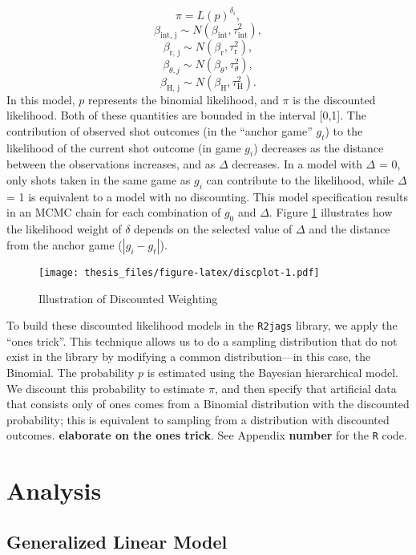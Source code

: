 \documentclass[12pt,twoside]{dukestatscithesis}
\theoremstyle{definition}
\theoremstyle{definition}
\theoremstyle{definition}
\theoremstyle{remark}
\begin{document}
\[
\pi = L(p)^{\delta_i},
\] \[
\beta_{\text{int, j}} \sim N(\beta_{\text{int}}, \tau^2_{\text{int}}),
\] \[
\beta_{\text{r, j}} \sim N(\beta_{\text{r}}, \tau^2_{\text{r}}),
\] \[
\beta_{\theta, j} \sim N(\beta_{\theta}, \tau^2_{\theta}),
\] \[
\beta_{\text{H, j}} \sim N(\beta_{\text{H}}, \tau^2_{\text{H}}).
\] In this model, \(p\) represents the binomial likelihood, and \(\pi\)
is the discounted likelihood. Both of these quantities are bounded in
the interval {[}0,1{]}. The contribution of observed shot outcomes (in
the ``anchor game'' \(g_t\)) to the likelihood of the current shot
outcome (in game \(g_i\)) decreases as the distance between the
observations increases, and as \(\Delta\) decreases. In a model with
\(\Delta\) = 0, only shots taken in the same game as \(g_i\) can
contribute to the likelihood, while \(\Delta\) = 1 is equivalent to a
model with no discounting. This model specification results in an MCMC
chain for each combination of \(g_0\) and \(\Delta\). Figure
\ref{fig:discplot} illustrates how the likelihood weight of \(\delta\)
depends on the selected value of \(\Delta\) and the distance from the
anchor game (\(|g_i - g_t|\)).
\begin{figure}[htbp]
\centering
\texttt{[image: thesis\_files/figure-latex/discplot-1.pdf]}
\caption{\label{fig:discplot}Illustration of Discounted Weighting}
\end{figure}
To build these discounted likelihood models in the \texttt{R2jags}
library, we apply the ``ones trick''. This technique allows us to do a
sampling distribution that do not exist in the library by modifying a
common distribution---in this case, the Binomial. The probability \(p\)
is estimated using the Bayesian hierarchical model. We discount this
probability to estimate \(\pi\), and then specify that artificial data
that consists only of ones comes from a Binomial distribution with the
discounted probability; this is equivalent to sampling from a
distribution with discounted outcomes. \textbf{elaborate on the ones
trick}. See Appendix \textbf{number} for the \texttt{R} code.

\section{Analysis}\label{analysis}

\subsection{Generalized Linear Model}\label{generalized-linear-model-1}
\end{document}
